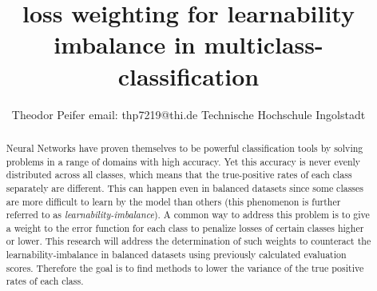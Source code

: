 \documentclass[journal]{IEEEtran}
\begin{document}
\title{\textbf{loss weighting for learnability imbalance in multiclass-classification}}



\author{Theodor Peifer
        \linebreak
        email: thp7219@thi.de
        \linebreak
        Technische Hochschule Ingolstadt
}



\maketitle


\begin{abstract}
Neural Networks have proven themselves to be powerful classification
tools by solving problems in a range of domains with high accuracy.
Yet this accuracy is never evenly distributed across all classes, which means that the true-positive rates of each class separately are different.
This can happen even in balanced datasets since some classes are more difficult to learn by the model than others (this phenomenon is further referred to as \emph{learnability-imbalance}).
A common way to address this problem is to give a weight to the error function for each class to penalize losses of certain classes higher or lower.
This research will address the determination of such weights to counteract the learnability-imbalance in balanced datasets using previously calculated evaluation scores.
Therefore the goal is to find methods to lower the variance of the true positive rates of each class.
\end{abstract}
\end{document}
